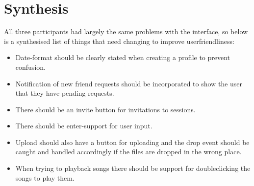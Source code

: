 \section{Synthesis}
All three participants had largely the same problems with the interface, so below is a synthesised list of things that need changing to improve userfriendliness:
\begin{itemize}
	\item Date-format should be clearly stated when creating a profile to prevent confusion.
	\item Notification of new friend requests should be incorporated to show the user that they have pending requests.
	\item There should be an invite button for invitations to sessions.
	\item There should be enter-support for user input. 
	\item Upload should also have a button for uploading and the drop event should be caught and handled accordingly if the files are dropped in the wrong place.
	\item When trying to playback songs there should be support for doubleclicking the songs to play them.
\end{itemize}